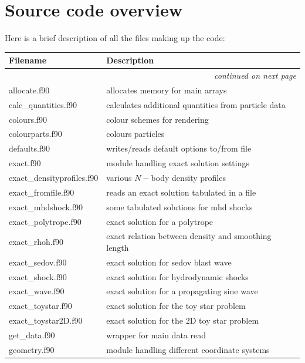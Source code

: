 \documentclass[a4paper,11pt]{article}
\begin{document}
\newpage
\appendix

\section{Source code overview}
Here is a brief description of all the files making up the code:
\begin{longtable}{|lp{}|}
\hline
Filename & Description \\
\hline \endhead
\multicolumn{2}{|r|}{\emph{continued on next page}} \\
\hline \endfoot
\hline \endlastfoot
     allocate.f90           & allocates memory for main arrays \\
     calc\_quantities.f90    & calculates additional quantities from particle data \\
     colours.f90            & colour schemes for rendering\\
     colourparts.f90	 & colours particles\\
     defaults.f90           & writes/reads default options to/from file\\
     exact.f90              & module handling exact solution settings\\
     exact\_densityprofiles.f90 & various $N-$body density profiles \\
     exact\_fromfile.f90     & reads an exact solution tabulated in a file\\
     exact\_mhdshock.f90     & some tabulated solutions for mhd shocks\\ 
     exact\_polytrope.f90    & exact solution for a polytrope\\
     exact\_rhoh.f90	 & exact relation between density and smoothing length\\
     exact\_sedov.f90        & exact solution for sedov blast wave\\
     exact\_shock.f90        & exact solution for hydrodynamic shocks\\
     exact\_wave.f90         & exact solution for a propagating sine wave\\
     exact\_toystar.f90      & exact solution for the toy star problem\\
     exact\_toystar2D.f90    & exact solution for the 2D toy star problem\\
     get\_data.f90           & wrapper for main data read\\
     geometry.f90           & module handling different coordinate systems\\

\end{longtable}
\end{document}
